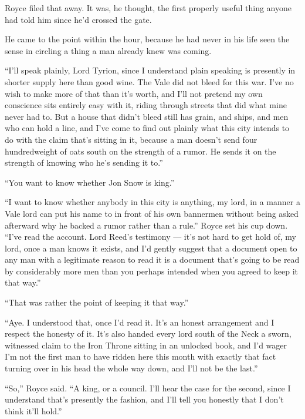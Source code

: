 Royce filed that away. It was, he thought, the first properly useful thing anyone had told him since he’d crossed the gate.

\sceneBreak

He came to the point within the hour, because he had never in his life seen the sense in circling a thing a man already knew was coming.

“I’ll speak plainly, Lord Tyrion, since I understand plain speaking is presently in shorter supply here than good wine. The Vale did not bleed for this war. I’ve no wish to make more of that than it’s worth, and I’ll not pretend my own conscience sits entirely easy with it, riding through streets that did what mine never had to. But a house that didn’t bleed still has grain, and ships, and men who can hold a line, and I’ve come to find out plainly what this city intends to do with the claim that’s sitting in it, because a man doesn’t send four hundredweight of oats south on the strength of a rumor. He sends it on the strength of knowing who he’s sending it to.”

“You want to know whether Jon Snow is king.”

“I want to know whether anybody in this city is anything, my lord, in a manner a Vale lord can put his name to in front of his own bannermen without being asked afterward why he backed a rumor rather than a rule.” Royce set his cup down. “I’ve read the account. Lord Reed’s testimony — it’s not hard to get hold of, my lord, once a man knows it exists, and I’d gently suggest that a document open to any man with a legitimate reason to read it is a document that’s going to be read by considerably more men than you perhaps intended when you agreed to keep it that way.”

“That was rather the point of keeping it that way.”

“Aye. I understood that, once I’d read it. It’s an honest arrangement and I respect the honesty of it. It’s also handed every lord south of the Neck a sworn, witnessed claim to the Iron Throne sitting in an unlocked book, and I’d wager I’m not the first man to have ridden here this month with exactly that fact turning over in his head the whole way down, and I’ll not be the last.”

\sceneBreak

“So,” Royce said. “A king, or a council. I’ll hear the case for the second, since I understand that’s presently the fashion, and I’ll tell you honestly that I don’t think it’ll hold.”

